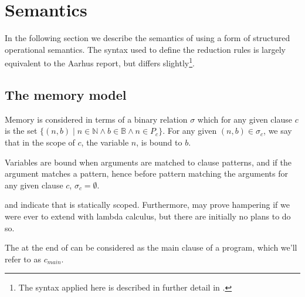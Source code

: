 \section{Semantics}\label{section:d-sos}





In the following section we describe the semantics of \D{} using a form of
structured operational semantics. The syntax used to define the reduction rules
is largely equivalent to the Aarhus report\cite{sos}, but differs
slightly\footnote{The syntax applied here is described in further detail in
.}.

\subsection{The memory model}\label{section:d-semantics-memory}

\begin{definition}\label{definition:memory} Memory is considered in terms of a
binary relation $\sigma$ which for any given clause $c$ is the set $\{(n,b)\mid
n\in\mathbb{N} \wedge b\in\mathbb{B} \wedge n\in P_c\}$. For any given
$(n,b)\in\sigma_c$, we say that in the scope of $c$, the variable $n$, is bound
to $b$.\end{definition}

\begin{corollary}\label{corollary:init-empty-scope} Variables are bound when
arguments are matched to clause patterns, and if the argument matches a
pattern, hence before pattern matching the arguments for any given clause $c$,
$\sigma_c=\emptyset$.\end{corollary}

 and  indicate
that \D{} is statically scoped.  Furthermore,  may
prove hampering if we were ever to extend \D{} with lambda calculus, but there
are initially no plans to do so.

\begin{definition} The  at the end of  can
be considered as the main clause of a program, which we'll refer to as
$c_{main}$.\end{definition}

